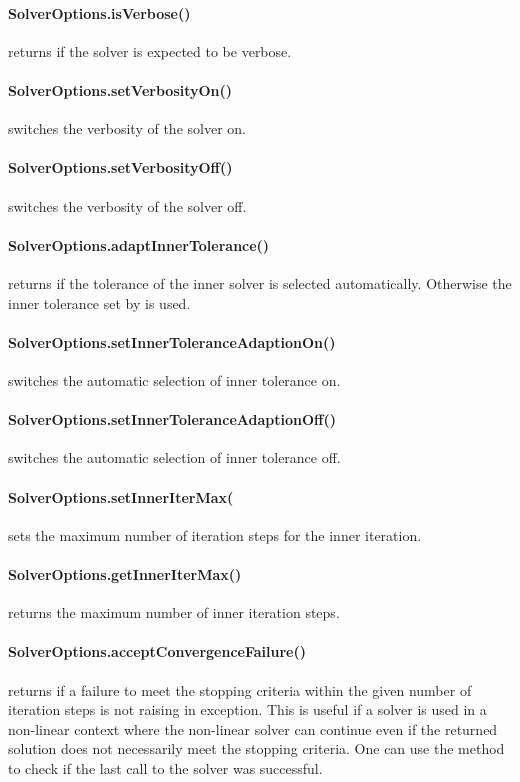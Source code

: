 \paragraph{SolverOptions.isVerbose()}
returns \True if the solver is expected to be verbose.


\paragraph{SolverOptions.setVerbosityOn()}
switches the verbosity of the solver on.


\paragraph{SolverOptions.setVerbosityOff()}
switches the verbosity of the solver off.


\paragraph{SolverOptions.adaptInnerTolerance()}
returns \True if the tolerance of the inner solver is selected automatically.
Otherwise the inner tolerance set by  is used.


\paragraph{SolverOptions.setInnerToleranceAdaptionOn()}
switches the automatic selection of inner tolerance on.


\paragraph{SolverOptions.setInnerToleranceAdaptionOff()}
switches the automatic selection of inner tolerance off.


\paragraph{SolverOptions.setInnerIterMax(
}
sets the maximum number of iteration steps for the inner iteration.


\paragraph{SolverOptions.getInnerIterMax()}
returns the maximum number of inner iteration steps.


\paragraph{SolverOptions.acceptConvergenceFailure()}
returns \True if a failure to meet the stopping criteria within the given
number of iteration steps is not raising in exception. This is useful
if a solver is used in a non-linear context where the non-linear solver can
continue even if the returned solution does not necessarily meet the stopping
criteria. One can use the  method to check if the
last call to the solver was successful.


